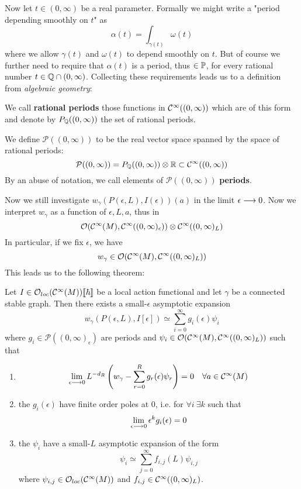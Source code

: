Now let $t \in (0, \infty)$ be a real parameter. Formally we might write a "period depending smoothly on $t$" as
$$ \alpha(t) = \int_{\gamma(t)} \omega(t) $$
where we allow $\gamma(t)$ and $\omega(t)$ to depend smoothly on $t$. But of course we further need to require that $\alpha(t)$ is a period, thus $\in \mathbb{P}$, for every rational number $t \in \mathbb{Q} \cap (0,\infty)$. Collecting these requirements leads us to a definition from \emph{algebraic geometry}:

\begin{definition}
  We call \textbf{rational periods} those functions in $\mathcal{C}^{\infty}((0,\infty))$ which are of this form and denote by $P_{\mathbb{Q}}((0,\infty))$ the set of rational periods.
\end{definition}

\begin{definition}
  We define $\mathcal{P}((0,\infty))$ to be the real vector space spanned by the space of rational periods:
  $$ \mathcal{P}((0,\infty)) = P_{\mathbb{Q}}((0,\infty)) \otimes \mathbb{R} \subset \mathcal{C}^{\infty}((0,\infty)) $$
  By an abuse of notation, we call elements of $\mathcal{P}((0,\infty))$ \textbf{periods}.
\end{definition}

Now we still investigate $w_\gamma(P(\epsilon,L), I(\epsilon))(a)$ in the limit $\epsilon \lra 0$. Now we interpret $w_\gamma$ as a function of $\epsilon,L,a$, thus in
$$ \OO(\Ci(M), \Ci((0,\infty)_\epsilon)) \otimes \Ci((0,\infty)_L) $$
In particular, if we fix $\epsilon$, we have
$$ w_\gamma \in \mathcal{O}(\mathcal{C}^{\infty}(M), \mathcal{C}^{\infty}((0,\infty)_L)) $$
This leads us to the following theorem:

\begin{theo}
  Let $I \in \mathcal{O}_{loc}(\mathcal{C}^{\infty}(M))\llbracket \hbar \rrbracket$ be a local action functional and let $\gamma$ be a connected stable graph. Then there exists a small-$\epsilon$ asymptotic expansion
  $$ w_\gamma (P(\epsilon,L), I[\epsilon]) \simeq \sum_{i=0}^{\infty} g_i(\epsilon) \psi_i $$
  where $g_i \in \mathcal{P}((0,\infty)_\epsilon)$ are periods and $\psi_i \in \mathcal{O}(\mathcal{C}^{\infty}(M), \mathcal{C}^{\infty}((0,\infty)_L))$ such that
  \begin{enumerate}
    \item $$ \lim_{\epsilon\lra 0} L^{-d_R} \left(w_\gamma - \sum_{r=0}^R g_r(\epsilon) \psi_r \right) = 0 \quad \forall a \in \Ci(M) $$

    \item the $g_i(\epsilon)$ have finite order poles at $0$, i.e. for $\forall i \ \exists k$ such that
    $$ \lim_{\epsilon\lra 0} \epsilon^k g_i(\epsilon) = 0 $$

    \item the $\psi_i$ have a small-$L$ asymptotic expansion of the form
    $$ \psi_i \simeq \sum_{j=0}^{\infty} f_{i,j} (L) \psi_{i,j} $$
    where $\psi_{i,j} \in \mathcal{O}_{loc}(\mathcal{C}^{\infty}(M))$ and $f_{i,j} \in \mathcal{C}^{\infty}((0,\infty)_L)$.
  \end{enumerate}
\end{theo}

